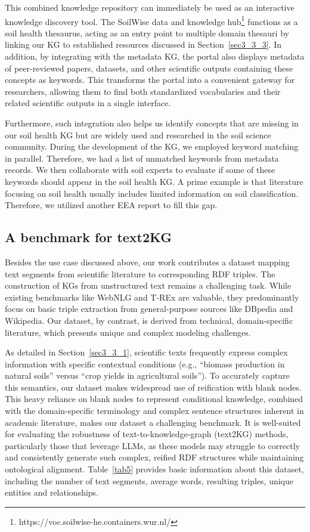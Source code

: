 \documentclass[preprint,12pt]{elsarticle}
\begin{document}
This combined knowledge repository can immediately be used as an interactive knowledge discovery tool. The SoilWise data and knowledge hub\footnote{https://voc.soilwise-he.containers.wur.nl/} functions as a soil health thesaurus, acting as an entry point to multiple domain thesauri by linking our KG to established resources discussed in Section~\ref{sec3_3_3}. In addition, by integrating with the metadata KG, the portal also displays metadata of peer-reviewed papers, datasets, and other scientific outputs containing these concepts as keywords. This transforms the portal into a convenient gateway for researchers, allowing them to find both standardized vocabularies and their related scientific outputs in a single interface.

Furthermore, such integration also helps us identify concepts that are missing in our soil health KG but are widely used and researched in the soil science community. During the development of the KG, we employed keyword matching in parallel. Therefore, we had a list of unmatched keywords from metadata records. We then collaborate with soil experts to evaluate if some of these keywords should appear in the soil health KG. A prime example is that literature focusing on soil health usually includes limited information on soil classification. Therefore, we utilized another EEA report \citep{doi/10.2760/7007291} to fill this gap.

\subsection{A benchmark for text2KG}\label{sec6_2}
Besides the use case discussed above, our work contributes a dataset mapping text segments from scientific literature to corresponding RDF triples. The construction of KGs from unstructured text remains a challenging task. While existing benchmarks like WebNLG \citep{gardent-etal-2017-webnlg} and T-REx \citep{elsahar-etal-2018-rex} are valuable, they predominantly focus on basic triple extraction from general-purpose sources like DBpedia and Wikipedia. Our dataset, by contrast, is derived from technical, domain-specific literature, which presents unique and complex modeling challenges.

As detailed in Section~\ref{sec3_3_1}, scientific texts frequently express complex information with specific contextual conditions (e.g., ``biomass production in natural soils'' versus ``crop yields in agricultural soils''). To accurately capture this semantics, our dataset makes widespread use of reification with blank nodes. This heavy reliance on blank nodes to represent conditional knowledge, combined with the domain-specific terminology and complex sentence structures inherent in academic literature, makes our dataset a challenging benchmark. It is well-suited for evaluating the robustness of text-to-knowledge-graph (text2KG) methods, particularly those that leverage LLMs, as these models may struggle to correctly and consistently generate such complex, reified RDF structures while maintaining ontological alignment. Table~\ref{tab5} provides basic information about this dataset, including the number of text segments, average words, resulting triples, unique entities and relationships.
\end{document}
